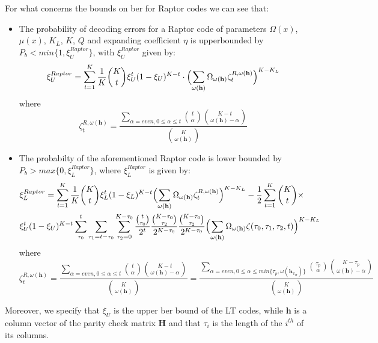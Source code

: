For what concerns the bounds on \gls{ber} for Raptor codes we can see that:
\begin{itemize}
  \item The probability of decoding errors for a Raptor code of parameters $\Omega(x)$, $\mu(x)$, $K_L$, $K$, $Q$ and expanding coefficient $\eta$ is upperbounded by $P_b < min\{1,\xi_U^{Raptor}\}$, with $\xi_U^{Raptor}$ given by:
  \begin{equation}
    \xi_U^{Raptor} = \sum_{t=1}^K\frac{1}{K}\binom{K}{t}\xi_U^t(1-\xi_U)^{K-t}\cdot\Bigl(\sum_{\omega(\mathbf{h})}\Omega_{\omega(\mathbf{h})}\zeta_t^{R,\omega(\mathbf{h})}\Bigr)^{K-K_L}
  \end{equation}
  where
  \begin{equation}
    \zeta_t^{R,\omega(\mathbf{h})} = \frac{\sum_{\alpha = even,0\leq\alpha\leq t}\binom{t}{\alpha}\binom{K-t}{\omega(\mathbf{h})-\alpha}}{\binom{K}{\omega(\mathbf{h})}}
  \end{equation}
  \item The probabilty of the aforementioned Raptor code is lower bounded by $P_b > max\{0,\xi_L^{Raptor}\}$, where $\xi_L^{Raptor}$ is given by:
  \begin{align}
    &\xi_L^{Raptor} = \sum_{t=1}^K\frac{1}{K}\binom{K}{t}\xi_L^t(1-\xi_L)^{K-t}\Bigl(\sum_{\omega(\mathbf{h})}\Omega_{\omega(\mathbf{h})}\zeta_t^{R,\omega(\mathbf{h})}\Bigr)^{K-K_L}-\frac{1}{2}\sum_{t=1}^K\binom{K}{t}\times\\
    &\xi_U^t(1-\xi_U)^{K-t}\sum_{\tau_0}^t\sum_{\tau_1 = t-\tau_0}\sum_{\tau_2=0}^{K-\tau_0}\frac{\binom{t}{\tau_0}}{2^t}\frac{\binom{K-\tau_0}{\tau_2}}{2^{K-\tau_0}}\frac{\binom{K-\tau_0}{\tau_2}}{2^{K-\tau_0}}\Bigl(\sum_{\omega(\mathbf{h})}\Omega_{\omega(\mathbf{h})}\zeta(\tau_0,\tau_1,\tau_2,t)\Bigr)^{K-K_L}
  \end{align}
  where
  \begin{equation}
    \zeta_t^{R,\omega(\mathbf{h})} = \frac{\sum\limits_{\alpha = even,0\leq\alpha\leq t}\binom{t}{\alpha}\binom{K-t}{\omega(\mathbf{h})-\alpha}}{\binom{K}{\omega(\mathbf{h})}} = \frac{\sum\limits_{\alpha=even,0\leq\alpha\leq min\{\tau_p,\omega(\mathbf{h_{\tau_p}})\}}\binom{\tau_p}{\alpha}\binom{K-\tau_p}{\omega(\mathbf{h})-\alpha}}{\binom{K}{\omega(\mathbf{h})}}
  \end{equation}
\end{itemize}
Moreover, we specify that $\xi_U$ is the upper \gls{ber} bound of the LT codes, while $\mathbf{h}$ is a column vector of the parity check matrix $\mathbf{H}$ and that $\tau_i$ is the length of the $i^{th}$ of its columns.
